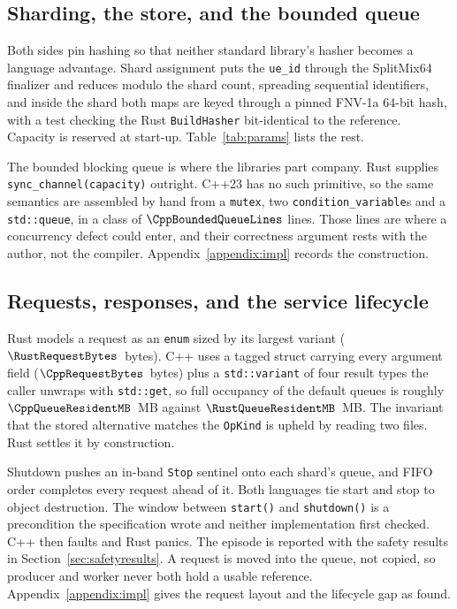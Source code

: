 \subsection{Sharding, the store, and the bounded queue}
Both sides pin hashing so that neither standard library's hasher becomes a language advantage.
Shard assignment puts the \texttt{ue\_id} through the SplitMix64 finalizer and reduces modulo the
shard count, spreading sequential identifiers, and inside the shard both maps are keyed through a
pinned FNV-1a 64-bit hash, with a test checking the Rust \texttt{BuildHasher} bit-identical to the
reference. Capacity is reserved at start-up. Table~\ref{tab:params} lists the rest.

The bounded blocking queue is where the libraries part company. Rust supplies
\texttt{sync\_channel(capacity)} outright. C++23 has no such primitive, so the same semantics are
assembled by hand from a \texttt{mutex}, two \texttt{condition\_variable}s and a
\texttt{std::queue}, in a class of $\CppBoundedQueueLines$ lines. Those lines are where a
concurrency defect could enter, and their correctness argument rests with the author, not the
compiler. Appendix~\ref{appendix:impl} records the construction.

\subsection{Requests, responses, and the service lifecycle}\label{sec:tagged}
\label{sec:request}
Rust models a request as an \texttt{enum} sized by its largest variant
($\RustRequestBytes$~bytes). C++ uses a tagged struct carrying every argument field
($\CppRequestBytes$~bytes) plus a \texttt{std::variant} of four result types the caller unwraps
with \texttt{std::get}, so full occupancy of the default queues is roughly
$\CppQueueResidentMB$~MB against $\RustQueueResidentMB$~MB. The invariant that the stored
alternative matches the \texttt{OpKind} is upheld by reading two files. Rust settles it by
construction.

Shutdown pushes an in-band \texttt{Stop} sentinel onto each shard's queue, and FIFO order
completes every request ahead of it. Both languages tie start and stop to object destruction.
The window between \texttt{start()} and \texttt{shutdown()} is a precondition the specification
wrote and neither implementation first checked. C++ then faults and Rust panics. The episode is
reported with the safety results in Section~\ref{sec:safetyresults}.
A request is moved into the queue, not copied, so producer and worker never both hold a usable
reference. Appendix~\ref{appendix:impl} gives the request layout and the lifecycle gap as found.

